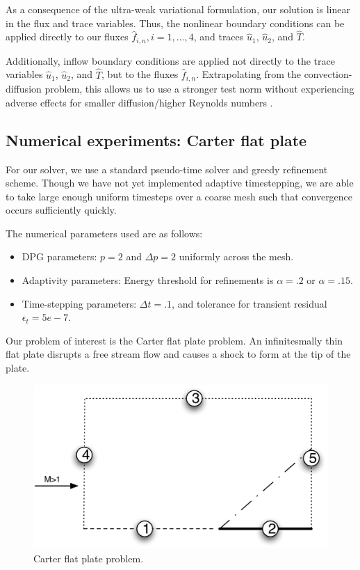 As a consequence of the ultra-weak variational formulation, our solution is linear in the flux and trace variables. Thus, the nonlinear boundary conditions can be applied directly to our fluxes $\widehat{f}_{i,n}, i = 1,\ldots,4$, and traces $\widehat{u}_1$, $\widehat{u}_2$, and $\widehat{T}$. 

Additionally, inflow boundary conditions are applied not directly to the trace variables $\widehat{u}_1$, $\widehat{u}_2$, and $\widehat{T}$, but to the fluxes $\widehat{f}_{i,n}$. Extrapolating from the convection-diffusion problem, this allows us to use a stronger test norm without experiencing adverse effects for smaller diffusion/higher Reynolds numbers \cite{DPGrobustness,DPGrobustness2}.

\subsection{Numerical experiments: Carter flat plate}

For our solver, we use a standard pseudo-time solver and greedy refinement scheme. Though we have not yet implemented adaptive timestepping, we are able to take large enough uniform timesteps over a coarse mesh such that convergence occurs sufficiently quickly.

The numerical parameters used are as follows:
\begin{itemize}
\item{DPG parameters:} $p = 2$ and $\Delta p = 2$ uniformly across the mesh. 
\item{Adaptivity parameters:} Energy threshold for refinements is $\alpha = .2$ or $\alpha = .15$. 
\item{Time-stepping parameters:} $\Delta t = .1$, and tolerance for transient residual $\epsilon_t = 5e-7$.
\end{itemize}

Our problem of interest is the Carter flat plate problem. An infinitesmally thin flat plate disrupts a free stream flow and causes a shock to form at the tip of the plate. 

\begin{figure}[!h]
\centering
\includegraphics[scale=.5]{figs/flat_plate_BCs.pdf}
\caption{Carter flat plate problem.}
\end{figure}

